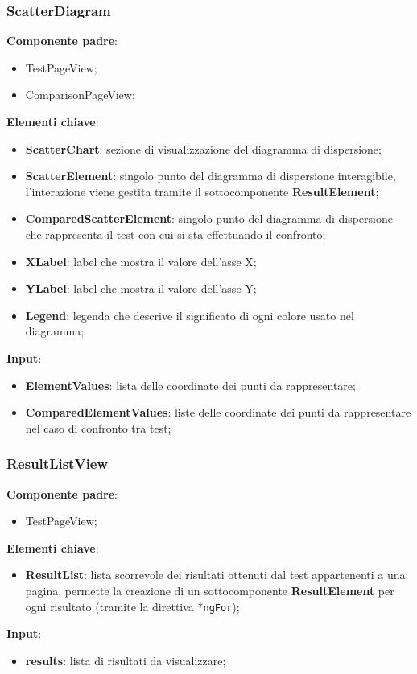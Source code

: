 \subsubsection{ScatterDiagram}
\textbf{Componente padre}:
\begin{itemize}
    \item TestPageView;
    \item ComparisonPageView;
\end{itemize}
\textbf{Elementi chiave}:
\begin{itemize}
    \item \textbf{ScatterChart}: sezione di visualizzazione del diagramma di dispersione;
    \item \textbf{ScatterElement}: singolo punto del diagramma di dispersione interagibile, l'interazione viene gestita tramite il sottocomponente \textbf{ResultElement};
    \item \textbf{ComparedScatterElement}: singolo punto del diagramma di dispersione che rappresenta il test con cui si sta effettuando il confronto;
    \item \textbf{XLabel}: label che mostra il valore dell'asse X;
    \item \textbf{YLabel}: label che mostra il valore dell'asse Y;
    \item \textbf{Legend}: legenda che descrive il significato di ogni colore usato nel diagramma;
\end{itemize}
\textbf{Input}:
\begin{itemize}
    \item \textbf{ElementValues}: lista delle coordinate dei punti da rappresentare;
    \item \textbf{ComparedElementValues}: liste delle coordinate dei punti da rappresentare nel caso di confronto tra test;
\end{itemize}
\subsubsection{ResultListView}
\textbf{Componente padre}:
\begin{itemize}
    \item TestPageView;
\end{itemize}
\textbf{Elementi chiave}:
\begin{itemize}
    \item \textbf{ResultList}: lista scorrevole dei risultati ottenuti dal test appartenenti a una pagina, permette la creazione di un sottocomponente \textbf{ResultElement} per ogni risultato (tramite la direttiva *\texttt{ngFor});
\end{itemize}
\textbf{Input}:
\begin{itemize}
    \item \textbf{results}: lista di risultati da visualizzare;
\end{itemize}
